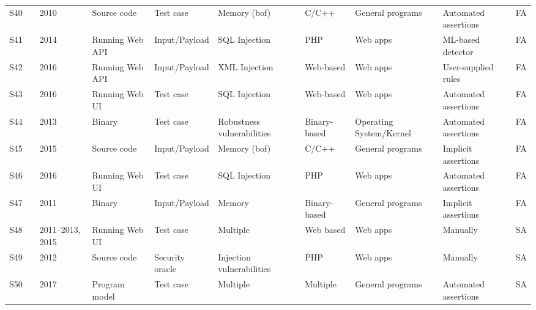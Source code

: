 \begin{table}[t]
{\begin{tabular}{|lp{0.5cm}p{0.5cm}lllllll|}
S40 & \cite{shahriar2009automatic}  &  2010  & Source code &   Test case  &   Memory (bof) &  C/C++  &  General programs  & Automated assertions &   FA   \\
S41 & \cite{Appelt2014259}  &  2014  & Running Web API &   Input/Payload  &   SQL Injection &  PHP  &  Web apps  &  ML-based detector  &   FA   \\
S42 & \cite{Jan201612}  &  2016  & Running Web API &   Input/Payload  &   XML Injection &  Web-based  &  Web apps  &  User-supplied rules  &   FA   \\
S43 & \cite{Liu2016123}  &  2016  & Running Web UI &   Test case  &   SQL Injection &  Web-based  &  Web apps  &  Automated assertions  &   FA   \\
S44 & \cite{Cotroneo2013125}  &  2013  & Binary &   Test case  &  Robustness vulnerabilities &  Binary-based  &  Operating System/Kernel  &  Automated assertions  &   FA   \\
S45 & \cite{DelGrosso20083125}  &  2015  & Source code &  Input/Payload  &   Memory (bof)  &  C/C++  &  General programs  &  Implicit assertions  &   FA   \\
S46 & \cite{Aziz2016183}  &  2016  & Running Web UI &   Test case  &   SQL Injection &  PHP  &  Web apps  &  Automated assertions  &   FA   \\
S47 & \cite{babic2011statically}  &  2011  & Binary &  Input/Payload  &   Memory   &  Binary-based   &  General programs  &  Implicit assertions  &   FA   \\
S48 & \cite{marback2013threat, xu2011tool, xu2012automated, Xu2015247}  &  2011--2013, 2015  & Running Web UI &   Test case  &   Multiple &  Web based  &  Web apps  &  Manually &   SA   \\
S49 & \cite{avancini2012security}  &  2012  & Source code &  Security oracle  &   Injection vulnerabilities   &  PHP  &  Web apps  &  Manually  &   SA   \\
S50 & \cite{Khamaiseh2017534}  &  2017  & Program model &  Test case  &   Multiple &  Multiple  &  General programs  &  Automated assertions  &   SA   \\

\midrule


\end{tabular}}
\end{table}
